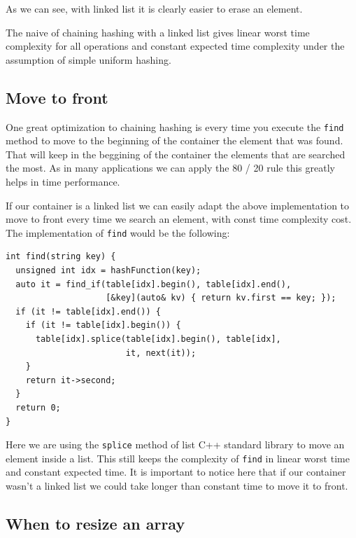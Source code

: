 As we can see, with linked list it is clearly easier to erase an element. 

The naive of chaining hashing with a linked list gives linear worst time complexity for all operations and constant expected time complexity under the assumption of simple uniform hashing. 



\subsection{Move to front}

One great optimization to chaining hashing is every time you execute the \texttt{find} method to move to the beginning of the container the element that was found. That will keep in the beggining of the container the elements that are searched the most. As in many applications we can apply the 80 / 20 rule this greatly helps in time performance.

If our container is a linked list we can easily adapt the above implementation to move to front every time we search an element, with const time complexity cost. The implementation of \texttt{find} would be the following:

\begin{lstlisting}
int find(string key) {
  unsigned int idx = hashFunction(key);
  auto it = find_if(table[idx].begin(), table[idx].end(),
                    [&key](auto& kv) { return kv.first == key; });
  if (it != table[idx].end()) {
    if (it != table[idx].begin()) {
      table[idx].splice(table[idx].begin(), table[idx],
                        it, next(it));
    }
    return it->second;
  }
  return 0;
}
\end{lstlisting}

Here we are using the \texttt{splice} method of list C++ standard library to move an element inside a list. This still keeps the complexity of \texttt{find} in linear worst time and constant expected time. It is important to notice here that if our container wasn't a linked list we could take longer than constant time to move it to front.

\subsection{When to resize an array}

